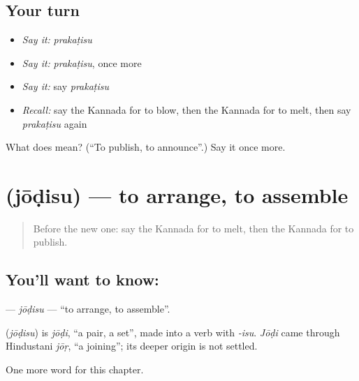 \subsection*{Your turn}
\begin{itemize}
\raggedright
  \item \emph{Say it:} \emph{prakaṭisu}
  \item \emph{Say it:} \emph{prakaṭisu}, once more
  \item \emph{Say it:} say \emph{prakaṭisu}
  \item \emph{Recall:} say the Kannada for to blow, then the Kannada for to melt, then say \emph{prakaṭisu} again
\end{itemize}

\begin{tcolorbox}[breakable,colback=teal!4,colframe=teal!35!black,title={Before you move on}]
What does  mean? (\textquotedblleft{}To publish, to announce\textquotedblright{}.) Say it once more.
\end{tcolorbox}
\section[\texorpdfstring{\kn{ಜೋಡಿಸು} (jōḍisu)}{ಜೋಡಿಸು (jōḍisu)}]{ (jōḍisu) — to arrange, to assemble}

\label{lesson:KA-C204-jodisu}



\begin{quote}
Before the new one: say the Kannada for to melt, then the Kannada for to publish.
\end{quote}

\subsection*{You'll want to know: }
\textbf{} — \emph{jōḍisu} — \textquotedblleft{}to arrange, to assemble\textquotedblright{}.

\begin{cousinweb}
\textbf{} (\emph{jōḍisu}) is \emph{jōḍi}, \textquotedblleft{}a pair, a set\textquotedblright{}, made into a verb with \emph{-isu}. \emph{Jōḍi} came through Hindustani \emph{jōṛ}, \textquotedblleft{}a joining\textquotedblright{}; its deeper origin is not settled.
\end{cousinweb}

\begin{grammarlens}[title={What you've built}]
One more word for this chapter.
\end{grammarlens}

